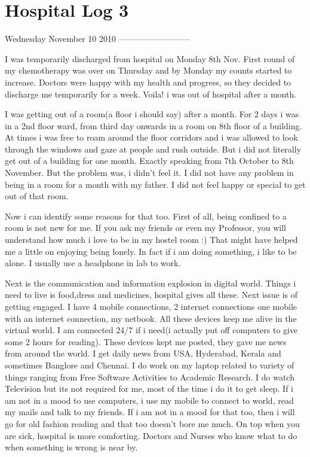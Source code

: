 \section*{Hospital Log 3}
\vskip 2pt

Wednesday November 10 2010 
--------------------------

I was temporarily discharged from hospital on Monday 8th Nov. First round of my chemotherapy was over on Thursday and by Monday my counts started to increase. Doctors were happy with my health and progress, so they decided to discharge me temporarily for a week. Voila! i was out of hospital after a month. 

I was getting out of a room(a floor i should say) after a month. For 2 days i was in a 2nd floor ward, from third day onwards in a room on 8th floor of a building. At times i was free to roam around the floor corridors and i was allowed to look through the windows and gaze at people and rush outside. But i did not literally get out of a building for one month. Exactly speaking from 7th October to 8th November. But the problem was, i didn't feel it. I did not have any problem in being in a room for a month with my father. I did not feel happy or special to get out of that room. 

Now i can identify some reasons for that too. First of all, being confined to a room is not new for me. If you ask my friends or even my Professor, you will understand how much i love to be in my hostel room :) That might have helped me a little on enjoying being lonely. In fact if i am doing something, i like to be alone. I usually use a headphone in lab to work.  

Next is the communication and information explosion in digital world. Things i need to live is food,dress and medicines, hospital gives all these. Next issue is of getting engaged. I have 4 mobile connections, 2 internet connections one mobile with an internet connection, my netbook. All these devices keep me alive in the virtual world. I am connected 24/7 if i need(i actually put off computers to give some 2 hours for reading). These devices kept me posted, they gave me news from around the world. I get daily news from USA, Hyderabad, Kerala and sometimes Banglore and Chennai. I do work on my laptop related to variety of things ranging from Free Software Activities to Academic Research. I do watch Television but its not required for me, most of the time i do it to get sleep. If i am not in a mood to use computers, i use my mobile to connect to world, read my mails and talk to my friends. If i am not in a mood for that too, then i will go for old fashion reading and that too doesn't bore me much. On top when you are sick, hospital is more comforting. Doctors and Nurses who know what to do when something is wrong is near by.

